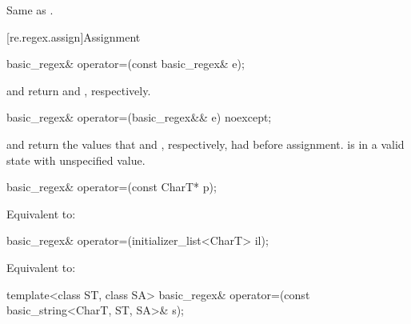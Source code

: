 \begin{itemdescr}
\pnum
\effects
Same as .
\end{itemdescr}

[re.regex.assign]{Assignment}

%
\begin{itemdecl}
basic_regex& operator=(const basic_regex& e);
\end{itemdecl}

\begin{itemdescr}
\pnum
\ensures
{} and  return
 and , respectively.
\end{itemdescr}

%
\begin{itemdecl}
basic_regex& operator=(basic_regex&& e) noexcept;
\end{itemdecl}

\begin{itemdescr}
\pnum
\ensures
{} and  return the values that
 and , respectively, had before assignment.
 is in a valid state with unspecified value.
\end{itemdescr}

%
\begin{itemdecl}
basic_regex& operator=(const CharT* p);
\end{itemdecl}

\begin{itemdescr}
\pnum
\effects
Equivalent to: 
\end{itemdescr}

%
\begin{itemdecl}
basic_regex& operator=(initializer_list<CharT> il);
\end{itemdecl}

\begin{itemdescr}
\pnum
\effects
Equivalent to: 
\end{itemdescr}

%
\begin{itemdecl}
template<class ST, class SA>
  basic_regex& operator=(const basic_string<CharT, ST, SA>& s);
\end{itemdecl}

